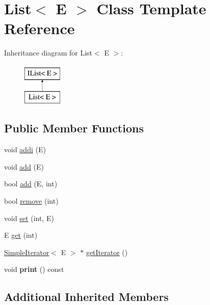 \hypertarget{classList}{\section{List$<$ E $>$ Class Template Reference}
\label{classList}
}
Inheritance diagram for List$<$ E $>$\-:\begin{figure}[H]
\begin{center}
\leavevmode
\includegraphics[height=2.000000cm]{classList}
\end{center}
\end{figure}
\subsection*{Public Member Functions}
\begin{DoxyCompactItemize}
\item 
void \hyperlink{classList_a40dfa61150de7310d69001c697598b04}{addi} (E)
\item 
void \hyperlink{classList_a2a130b7bc38cd968136f1f847e42d0cc}{add} (E)
\item 
bool \hyperlink{classList_a530267346ebec244900c162de6f467e1}{add} (E, int)
\item 
bool \hyperlink{classList_a46cec78299d3e23469276adf46adf9c1}{remove} (int)
\item 
void \hyperlink{classList_ac8b31be96806bd56f655436629ac2e7a}{set} (int, E)
\item 
E \hyperlink{classList_ab081a52d7a62aa6c5550ff9762f9427f}{get} (int)
\item 
\hyperlink{classSimpleIterator}{Simple\-Iterator}$<$ E $>$ $\ast$ \hyperlink{classList_accb5fe71cb60ba7bf0ccab362b1f87cb}{get\-Iterator} ()
\item 
\hypertarget{classList_ad2201bc77b15291f215523ecc96705dc}{void {\bfseries print} () const }\label{classList_ad2201bc77b15291f215523ecc96705dc}

\end{DoxyCompactItemize}
\subsection*{Additional Inherited Members}


